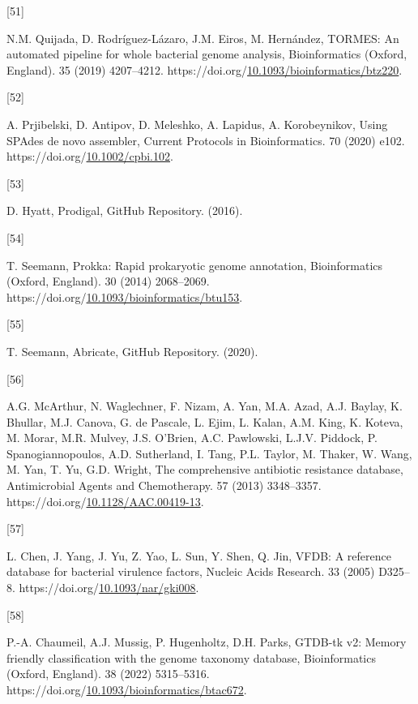\documentclass[preprint,3p,
a4paper]{elsarticle} %
\newlength{\cslhangindent}
\newlength{\csllabelwidth}
\newlength{\cslentryspacingunit} %
\newenvironment{CSLReferences}[2] %
 {%
  \setlength{\parindent}{0pt}
  \ifodd #1
  \let\oldpar\par
  \def\par{\hangindent=\cslhangindent\oldpar}
  \fi
  \setlength{\parskip}{#2\cslentryspacingunit}
 }%
 {}
\newcommand{\CSLLeftMargin}[1]{\parbox[t]{\csllabelwidth}{#1}}
\newcommand{\CSLRightInline}[1]{\parbox[t]{\linewidth - \csllabelwidth}{#1}\break}
\begin{document}
\begin{CSLReferences}{0}{0}
\leavevmode{}%
\CSLLeftMargin{{[}51{]} }%
\CSLRightInline{N.M. Quijada, D. Rodríguez-Lázaro, J.M. Eiros, M.
Hernández, TORMES: An automated pipeline for whole bacterial genome
analysis, Bioinformatics (Oxford, England). 35 (2019) 4207--4212.
https://doi.org/\href{https://doi.org/10.1093/bioinformatics/btz220}{10.1093/bioinformatics/btz220}.}

\leavevmode{}%
\CSLLeftMargin{{[}52{]} }%
\CSLRightInline{A. Prjibelski, D. Antipov, D. Meleshko, A. Lapidus, A.
Korobeynikov, Using SPAdes de novo assembler, Current Protocols in
Bioinformatics. 70 (2020) e102.
https://doi.org/\href{https://doi.org/10.1002/cpbi.102}{10.1002/cpbi.102}.}

\leavevmode{}%
\CSLLeftMargin{{[}53{]} }%
\CSLRightInline{D. Hyatt, Prodigal, GitHub Repository. (2016).}

\leavevmode{}%
\CSLLeftMargin{{[}54{]} }%
\CSLRightInline{T. Seemann, Prokka: Rapid prokaryotic genome annotation,
Bioinformatics (Oxford, England). 30 (2014) 2068--2069.
https://doi.org/\href{https://doi.org/10.1093/bioinformatics/btu153}{10.1093/bioinformatics/btu153}.}

\leavevmode{}%
\CSLLeftMargin{{[}55{]} }%
\CSLRightInline{T. Seemann, Abricate, GitHub Repository. (2020).}

\leavevmode{}%
\CSLLeftMargin{{[}56{]} }%
\CSLRightInline{A.G. McArthur, N. Waglechner, F. Nizam, A. Yan, M.A.
Azad, A.J. Baylay, K. Bhullar, M.J. Canova, G. de Pascale, L. Ejim, L.
Kalan, A.M. King, K. Koteva, M. Morar, M.R. Mulvey, J.S. O'Brien, A.C.
Pawlowski, L.J.V. Piddock, P. Spanogiannopoulos, A.D. Sutherland, I.
Tang, P.L. Taylor, M. Thaker, W. Wang, M. Yan, T. Yu, G.D. Wright, The
comprehensive antibiotic resistance database, Antimicrobial Agents and
Chemotherapy. 57 (2013) 3348--3357.
https://doi.org/\href{https://doi.org/10.1128/AAC.00419-13}{10.1128/AAC.00419-13}.}

\leavevmode{}%
\CSLLeftMargin{{[}57{]} }%
\CSLRightInline{L. Chen, J. Yang, J. Yu, Z. Yao, L. Sun, Y. Shen, Q.
Jin, VFDB: A reference database for bacterial virulence factors, Nucleic
Acids Research. 33 (2005) D325--8.
https://doi.org/\href{https://doi.org/10.1093/nar/gki008}{10.1093/nar/gki008}.}

\leavevmode{}%
\CSLLeftMargin{{[}58{]} }%
\CSLRightInline{P.-A. Chaumeil, A.J. Mussig, P. Hugenholtz, D.H. Parks,
GTDB-tk v2: Memory friendly classification with the genome taxonomy
database, Bioinformatics (Oxford, England). 38 (2022) 5315--5316.
https://doi.org/\href{https://doi.org/10.1093/bioinformatics/btac672}{10.1093/bioinformatics/btac672}.}


\end{CSLReferences}
\end{document}
